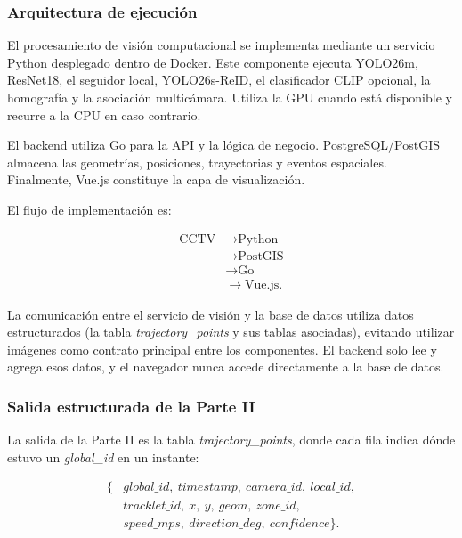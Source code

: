 \documentclass[12pt,letterpaper]{article}
\begin{document}
\subsubsection{Arquitectura de ejecución}

El procesamiento de visión computacional se implementa mediante un
servicio Python desplegado dentro de Docker. Este componente ejecuta
YOLO26m, ResNet18, el seguidor local, YOLO26s-ReID, el clasificador CLIP
opcional, la homografía y la asociación multicámara. Utiliza la GPU
cuando está disponible y recurre a la CPU en caso contrario.

El backend utiliza Go para la API y la lógica de negocio.
PostgreSQL/PostGIS almacena las geometrías, posiciones, trayectorias y
eventos espaciales. Finalmente, Vue.js constituye la capa de
visualización.

El flujo de implementación es:

\begin{equation}
\begin{aligned}
\text{CCTV}
&\rightarrow \text{Python}\\
&\rightarrow \text{PostGIS}\\
&\rightarrow \text{Go}\\
&\rightarrow \text{Vue.js}.
\end{aligned}
\end{equation}

La comunicación entre el servicio de visión y la base de datos utiliza
datos estructurados (la tabla \textit{trajectory\_points} y sus tablas
asociadas), evitando utilizar imágenes como contrato principal entre los
componentes. El backend solo lee y agrega esos datos, y el navegador
nunca accede directamente a la base de datos.

\subsubsection{Salida estructurada de la Parte II}

La salida de la Parte II es la tabla \textit{trajectory\_points}, donde
cada fila indica dónde estuvo un \textit{global\_id} en un instante:

\begin{equation}
\begin{aligned}
\{&
global\_id,\ timestamp,\ camera\_id,\ local\_id,\\
&tracklet\_id,\ x,\ y,\ geom,\ zone\_id,\\
&speed\_mps,\ direction\_deg,\ confidence
\}.
\end{aligned}
\end{equation}
\end{document}
